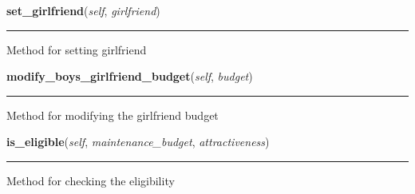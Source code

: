     \vspace{0.5ex}

\hspace{.8\funcindent}\begin{boxedminipage}{\funcwidth}

    \raggedright \textbf{set\_girlfriend}(\textit{self}, \textit{girlfriend})

    \vspace{-1.5ex}

    \rule{\textwidth}{0.5\fboxrule}
\setlength{\parskip}{2ex}
    Method for setting girlfriend

\setlength{\parskip}{1ex}
    \end{boxedminipage}

    \label{boy:Boy:modify_boys_girlfriend_budget}

    \vspace{0.5ex}

\hspace{.8\funcindent}\begin{boxedminipage}{\funcwidth}

    \raggedright \textbf{modify\_boys\_girlfriend\_budget}(\textit{self}, \textit{budget})

    \vspace{-1.5ex}

    \rule{\textwidth}{0.5\fboxrule}
\setlength{\parskip}{2ex}
    Method for modifying the girlfriend budget

\setlength{\parskip}{1ex}
    \end{boxedminipage}

    \label{boy:Boy:is_eligible}

    \vspace{0.5ex}

\hspace{.8\funcindent}\begin{boxedminipage}{\funcwidth}

    \raggedright \textbf{is\_eligible}(\textit{self}, \textit{maintenance\_budget}, \textit{attractiveness})

    \vspace{-1.5ex}

    \rule{\textwidth}{0.5\fboxrule}
\setlength{\parskip}{2ex}
    Method for checking the eligibility

\setlength{\parskip}{1ex}
    \end{boxedminipage}


